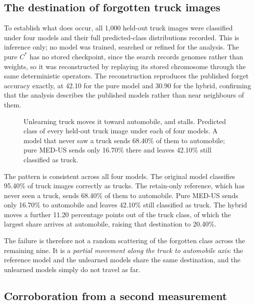 \subsection{The destination of forgotten truck images}

To establish what does occur, all 1{,}000 held-out truck images were classified
under four models and their full predicted-class distributions recorded. This is
inference only; no model was trained, searched or refined for the analysis. The
pure $C^{*}$ has no stored checkpoint, since the search records genomes rather
than weights, so it was reconstructed by replaying its stored chromosome through
the same deterministic operators. The reconstruction reproduces the published
forget accuracy exactly, at 42.10 for the pure model and 30.90 for the hybrid,
confirming that the analysis describes the published models rather than near
neighbours of them.

\begin{figure}[htbp]
  \centering
  \caption{Unlearning truck moves it toward automobile, and stalls. Predicted class
  of every held-out truck image under each of four models. A model that never saw a
  truck sends 68.40\% of them to automobile; pure MED-US sends only 16.70\% there
  and leaves 42.10\% still classified as truck.}
  \label{fig:truck-failure}
\end{figure}

The pattern is consistent across all four models. The original model classifies
95.40\% of truck images correctly as trucks. The retain-only reference, which has
never seen a truck, sends 68.40\% of them to automobile. Pure MED-US sends only
16.70\% to automobile and leaves 42.10\% still classified as truck. The hybrid
moves a further 11.20 percentage points out of the truck class, of which the
largest share arrives at automobile, raising that destination to 20.40\%.

The failure is therefore not a random scattering of the forgotten class across the
remaining nine. It is a \emph{partial movement along the truck to automobile
axis}: the reference model and the unlearned models share the same destination,
and the unlearned models simply do not travel as far.

\subsection{Corroboration from a second measurement}

